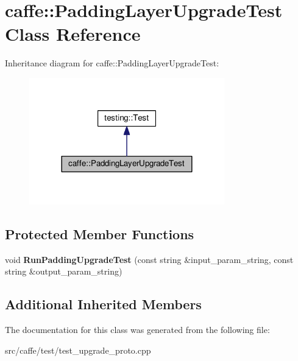 \hypertarget{classcaffe_1_1_padding_layer_upgrade_test}{}\section{caffe\+:\+:Padding\+Layer\+Upgrade\+Test Class Reference}
\label{classcaffe_1_1_padding_layer_upgrade_test}


Inheritance diagram for caffe\+:\+:Padding\+Layer\+Upgrade\+Test\+:
\nopagebreak
\begin{figure}[H]
\begin{center}
\leavevmode
\includegraphics[width=240pt]{classcaffe_1_1_padding_layer_upgrade_test__inherit__graph}
\end{center}
\end{figure}
\subsection*{Protected Member Functions}
\begin{DoxyCompactItemize}
\item 
\mbox{\label{classcaffe_1_1_padding_layer_upgrade_test_aba08eb6766f8d55f30f66d5549f42147}} 
void {\bfseries Run\+Padding\+Upgrade\+Test} (const string \&input\+\_\+param\+\_\+string, const string \&output\+\_\+param\+\_\+string)
\end{DoxyCompactItemize}
\subsection*{Additional Inherited Members}


The documentation for this class was generated from the following file\+:\begin{DoxyCompactItemize}
\item 
src/caffe/test/test\+\_\+upgrade\+\_\+proto.\+cpp\end{DoxyCompactItemize}
